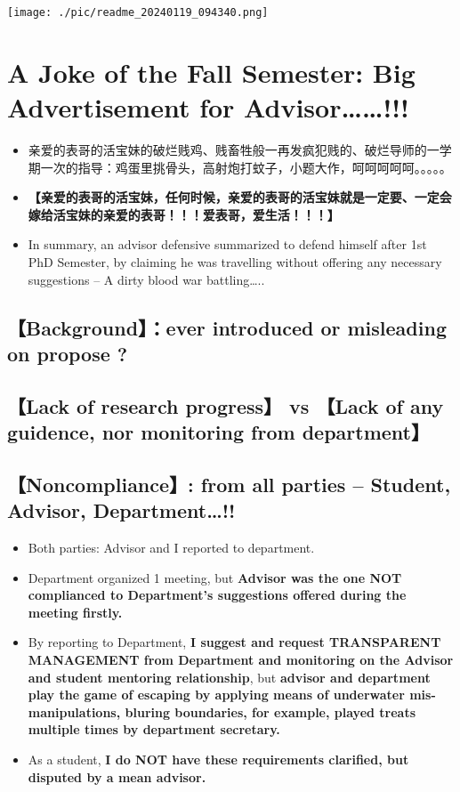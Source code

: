 \documentclass[9pt, b5paper]{article}
\begin{document}
\texttt{[image: ./pic/readme\_20240119\_094340.png]}
\section{A Joke of the Fall Semester: Big Advertisement for Advisor\ldots{}\ldots{}!!!}
\label{sec-3}
\begin{itemize}
\item 亲爱的表哥的活宝妹的破烂贱鸡、贱畜牲般一再发疯犯贱的、破烂导师的一学期一次的指导：鸡蛋里挑骨头，高射炮打蚊子，小题大作，呵呵呵呵呵。。。。。
\item \textbf{【亲爱的表哥的活宝妹，任何时候，亲爱的表哥的活宝妹就是一定要、一定会嫁给活宝妹的亲爱的表哥！！！爱表哥，爱生活！！！】}
\item In summary, an advisor defensive summarized to defend himself after 1st PhD Semester, by claiming he was travelling without offering any necessary suggestions -- A dirty blood war battling\ldots{}..
\end{itemize}
\subsection{【Background】：ever introduced or misleading on propose ?}
\label{sec-3-1}

\subsection{【Lack of research progress】 vs 【Lack of any guidence, nor monitoring from department】}
\label{sec-3-2}

\subsection{【Noncompliance】: from all parties -- Student, Advisor, Department\ldots{}!!}
\label{sec-3-3}
\begin{itemize}
\item Both parties: Advisor and I reported to department.
\item Department organized 1 meeting, but \textbf{Advisor was the one NOT complianced to Department's suggestions offered during the meeting firstly.}
\item By reporting to Department, \textbf{I suggest and request TRANSPARENT MANAGEMENT from Department and monitoring on the Advisor and student mentoring relationship}, but \textbf{advisor and department play the game of escaping by applying means of underwater mis-manipulations, bluring boundaries, for example, played treats multiple times by department secretary.}
\item As a student, \textbf{I do NOT have these requirements clarified, but disputed by a mean advisor.}
\end{itemize}
\end{document}
